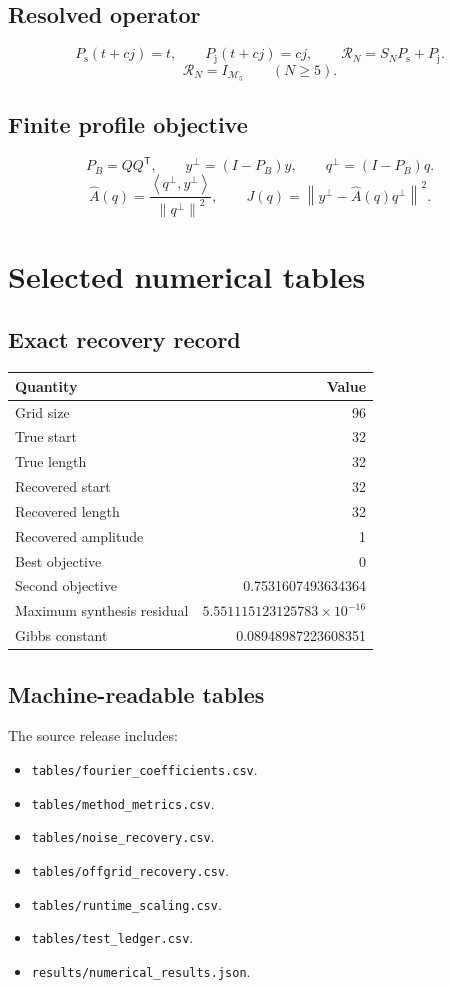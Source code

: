 \documentclass[11pt,oneside]{book}
\theoremstyle{remark}
\newcommand{\norm}[1]{\left\lVert #1\right\rVert}
\newcommand{\inner}[2]{\left\langle #1,#2\right\rangle}
\newcommand{\SN}{S_N}
\newcommand{\RN}{\mathcal R_N}
\newcommand{\Ps}{P_{\mathrm s}}
\newcommand{\Pj}{P_{\mathrm j}}
\begin{document}
\section{Resolved operator}
\[
\Ps(t+cj)=t,
\qquad
\Pj(t+cj)=cj,
\qquad
\RN=\SN\Ps+\Pj.
\]
\[
\RN=I_{\mathcal M_5}\qquad(N\ge5).
\]

\section{Finite profile objective}
\[
P_B=QQ^{\mathsf T},
\qquad
y^{\perp}=(I-P_B)y,
\qquad
q^{\perp}=(I-P_B)q.
\]
\[
\widehat A(q)=\frac{\inner{q^{\perp}}{y^{\perp}}}{\norm{q^{\perp}}^2},
\qquad
J(q)=\norm{y^{\perp}-\widehat A(q)q^{\perp}}^2.
\]

\chapter{Selected numerical tables}

\section{Exact recovery record}
\begin{center}
\begin{tabular}{lr}
\toprule
Quantity & Value\\
\midrule
Grid size & 96\\
True start & 32\\
True length & 32\\
Recovered start & 32\\
Recovered length & 32\\
Recovered amplitude & 1\\
Best objective & 0\\
Second objective & 0.7531607493634364\\
Maximum synthesis residual & $5.551115123125783\times10^{-16}$\\
Gibbs constant & 0.08948987223608351\\
\bottomrule
\end{tabular}
\end{center}

\section{Machine-readable tables}
The source release includes:
\begin{itemize}
\item \texttt{tables/fourier\_coefficients.csv}.
\item \texttt{tables/method\_metrics.csv}.
\item \texttt{tables/noise\_recovery.csv}.
\item \texttt{tables/offgrid\_recovery.csv}.
\item \texttt{tables/runtime\_scaling.csv}.
\item \texttt{tables/test\_ledger.csv}.
\item \texttt{results/numerical\_results.json}.
\end{itemize}
\end{document}
